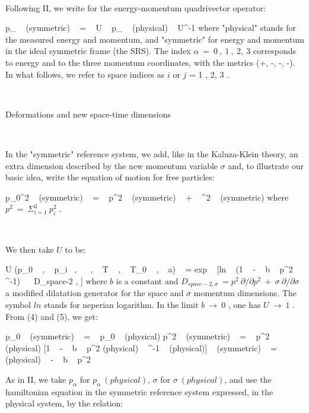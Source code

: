 \documentclass[a4paper,12pt,dvips]{article}
\makeatletter
\renewcommand{\section}{\@startsection{section}{1}{0in}
	{0.4\baselineskip}{0.1\baselineskip}{\Large\bf}}
\makeatother
\begin{document}
~

Following II, we write for the energy-momentum quadrivector operator:

\equation
p_{\alpha} ~ (symmetric) ~ = ~ U ~ p_{\alpha} ~ (physical) ~ U^{-1}
\endequation
\noindent
where "physical" stands for the measured energy and momentum, and "symmetric" for energy and momentum in the ideal symmetric frame (the SRS). The index $\alpha ~ = ~ 0 ~ , ~ 1 ~ , ~ 2, ~ 3$ corresponds to energy and to the three momentum coordinates, with the metrics (+, -, -, -). In what follows, we refer to space indices as $i$ or $j$ = 1 , 2, 3 .

~
~ 

\section{Deformations and new space-time dimensions}
\label{deformation.sec}

~

In the "symmetric" reference system, we add, like in the Kaluza-Klein theory, an extra dimension described by the new momentum variable $\sigma $ and, to illustrate our basic idea, write the equation of motion for free particles:

\equation
p_{0}^2 ~ (symmetric) ~ = ~ p^2 ~ (symmetric) ~ + ~ \sigma ^2 ~ (symmetric)
\endequation
\noindent
where $p^2 ~ = ~ \Sigma _{i=1} ^3 ~ p_{i}^2$ .

~

We then take $U$ to be:

\equation
U (p_0 ~ , ~ p_i ~,~ \sigma  ~ , ~ T ~ , ~ T_0 ~ , ~ a) ~ = exp ~ [ln ~ (1 ~ - ~ b ~ p^2 ~ \sigma ^{-1}) ~ ~D_{space-2 , \sigma}]
\endequation
\noindent
where $b$ is a constant and $D_{space-2 , \sigma} ~ = p^2 ~ \partial /\partial p^2 ~ + ~ \sigma ~ \partial /\partial \sigma $ a modified dilatation generator for the space and $\sigma$ momentum dimensions. The symbol $ln$ stands for neperian logarithm. In the limit $b ~ \rightarrow ~ 0$ , one has $U ~ \rightarrow ~ 1$ . From (4) and (5), we get:

\equation
p_0 ~ (symmetric) ~ = ~ p_0 ~ (physical)
\endequation
\equation
p^2 ~ (symmetric) ~ = ~ p^2 ~ (physical) [1 ~ - ~ b ~ p^2 (physical) ~ \sigma ^{-1} ~ (physical)]
\endequation
\equation
\sigma ~ (symmetric) ~ = ~ \sigma ~ (physical) ~ - ~ b ~ p^2
\endequation


As in II, we take $p_{\alpha }$ for $p_{\alpha } ~ (physical)$, $\sigma$ for $\sigma ~ (physical)$, and use the hamiltonian equation in the symmetric reference system expressed, in the physical system, by the relation:
\end{document}
